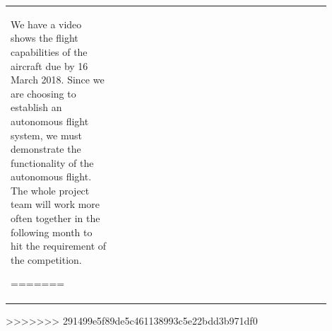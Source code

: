 \documentclass[onecolumn, draftclsnofoot,10pt, compsoc]{IEEEtran}
\begin{document}
\begin{center}
\begin{tabular}{|p{0.3\linewidth}|p{0.3\linewidth}|p{0.3\linewidth}|}
We have a video shows the flight capabilities of the aircraft due by 16 March 2018. Since we are choosing to establish an autonomous flight system, we must demonstrate the functionality of the autonomous flight. The whole project team will work more often together in the following month to hit the requirement of the competition.





=======
        \hline
            \end{tabular}
\end{center}
>>>>>>> 291499e5f89de5c461138993c5e22bdd3b971df0
\end{document}
